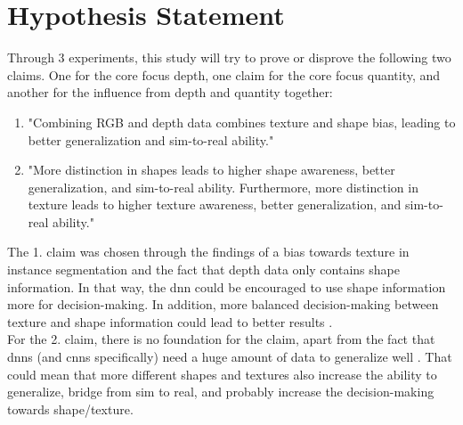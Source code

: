 	\section{Hypothesis Statement}
	\label{sec:hypothesis-statement}	
		Through 3 experiments, this study will try to prove or disprove the following two claims. One for the core focus depth, one claim for the core focus quantity, and another for the influence from depth and quantity together: 
		\begin{enumerate}
			\item "Combining RGB and depth data combines texture and shape bias, leading to better generalization and sim-to-real ability." %
			\item "More distinction in shapes leads to higher shape awareness, better generalization, and sim-to-real ability. Furthermore, more distinction in texture leads to higher texture awareness, better generalization, and sim-to-real ability."
		\end{enumerate}
		The 1. claim was chosen through the findings of a bias towards texture in instance segmentation \cite{Theodoridis2022} and the fact that depth data only contains shape information. In that way, the \ac{dnn} could be encouraged to use shape information more for decision-making. In addition, more balanced decision-making between texture and shape information could lead to better results \cite{Li2021}\cite{Co2021}\cite{Chung2023}.\\
		For the 2. claim, there is no foundation for the claim, apart from the fact that \ac{dnn}s (and \ac{cnn}s specifically) need a huge amount of data to generalize well \cite{Cho2016}\cite{Luca2022}. That could mean that more different shapes and textures also increase the ability to generalize, bridge from sim to real, and probably increase the decision-making towards shape/texture.
	
	



			